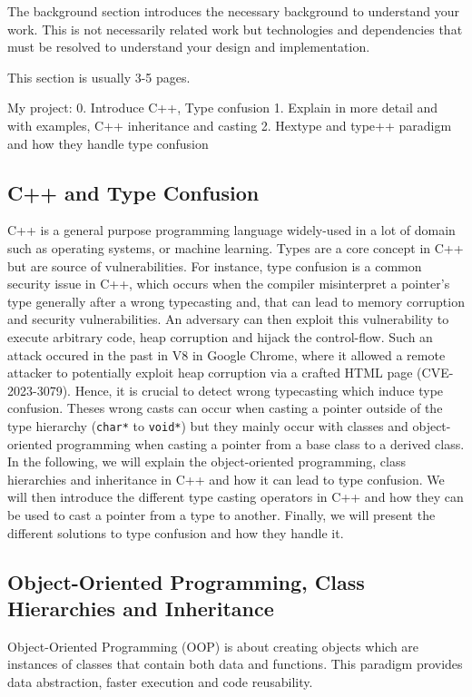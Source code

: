 \documentclass[a4paper,11pt,oneside]{report}
\begin{document}
The background section introduces the necessary background to understand your
work. This is not necessarily related work but technologies and dependencies
that must be resolved to understand your design and implementation.

This section is usually 3-5 pages.

My project:
0. Introduce C++, Type confusion
1. Explain in more detail and with examples, C++ inheritance and casting
2. Hextype and type++ paradigm and how they handle type confusion

\subsection{C++ and Type Confusion}

C++ is a general purpose programming language widely-used in a lot of domain such as operating systems, 
or machine learning. Types are a core concept in C++ but are source of vulnerabilities. For instance, type confusion 
is a common security issue in C++, which occurs when the compiler misinterpret a pointer's type generally after a wrong typecasting and,
that can lead to memory corruption and security vulnerabilities. An adversary can then exploit this vulnerability to execute arbitrary code, heap corruption and hijack the control-flow.
Such an attack occured in the past in V8 in Google Chrome, where it allowed a remote attacker to potentially exploit
heap corruption via a crafted HTML page (CVE-2023-3079). Hence, it is crucial to detect wrong typecasting which induce type confusion. 
Theses wrong casts can occur when casting a pointer outside of the type hierarchy (\texttt{char*} to \texttt{void*}) but they mainly occur with classes and object-oriented programming 
when casting a pointer from a base class to a derived class. In the following, we will explain the object-oriented programming, class hierarchies and inheritance in C++ and how it can lead to type confusion. 
We will then introduce the different type casting operators in C++ and how they can be used to cast a pointer from a type to another. Finally, we will present the different solutions to type confusion and how they handle it.

\subsection{Object-Oriented Programming, Class Hierarchies and Inheritance}
Object-Oriented Programming (OOP) is about creating objects which are instances of classes that contain both data and functions. This paradigm provides
data abstraction, faster execution and code reusability. 
\end{document}
